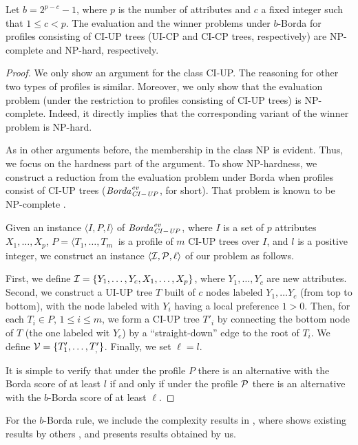 \begin{thm}
\label{thm6}
Let $b=2^{p-c}-1$, where $p$ is the number of attributes and $c$ a fixed
integer such that $1\leq c <p$. The evaluation
and the winner problems under $b$-Borda for profiles consisting of
CI-UP trees (UI-CP and CI-CP trees, respectively) are NP-complete 
and NP-hard, respectively.
\end{thm}
\begin{proof}
We only show an argument for the class CI-UP. The reasoning for other 
two types of profiles is similar. Moreover, we only show that the evaluation
problem (under the restriction to profiles consisting of CI-UP trees) is
NP-complete. Indeed, it directly implies that the corresponding variant of
the winner problem is NP-hard.
 
As in other arguments before, the membership in the class NP is evident.
Thus, we focus on the hardness part of the argument. To show NP-hardness,
we construct a reduction from the evaluation problem under Borda when
profiles consist of CI-UP trees ($\mathit{Borda}^{\mathit{ev}}_{\mathit{CI-UP}}$, for short). That problem is 
known to be NP-complete \cite{lang:aggLP}.

Given an instance $\langle I, P, l \rangle$ of $\mathit{Borda}^{\mathit{ev}}_{\mathit{CI-UP}}$, where $I$ is a set 
of $p$ attributes $X_1,\ldots, X_p$, $P=\langle T_1,\ldots, T_m\>$ is a profile
of $m$ CI-UP trees over $I$, and $l$ is a positive integer, we construct an 
instance $\langle \mathcal{I}, \mathcal{P},\ell\rangle$ of our problem as follows.

First, we define $\mathcal{I} = \{Y_1,\ldots, Y_c,X_1,\ldots,X_p \}$, where 
$Y_1, \ldots, Y_c$ are new attributes. Second, we construct a UI-UP tree $T$ 
built of $c$ nodes labeled $Y_1, \ldots Y_c$ (from top to bottom), with the 
node labeled with $Y_i$ having a local preference $1 > 0$. Then, for each  
$T_i \in P$, $1 \leq i \leq m$, we form a CI-UP tree $T'_i$ by connecting
the bottom node of $T$ (the one labeled wit $Y_c$) by a ``straight-down''
edge to the root of $T_i$. We define $\mathcal{V} = \{ T_1',\ldots,T_,' \}$. 
Finally, we set $\ell=l$.

It is simple to verify that under the profile $P$ there is an alternative 
with the Borda score of at least $l$ if and only if under the profile
$\mathcal{P}$ there is an alternative with the $b$-Borda score of at least $\ell$. 
\end{proof}

For the $b$-Borda rule, we include the complexity results in ,
where  shows existing results by others
\cite{lang:aggLP}, and  presents results obtained by us.

